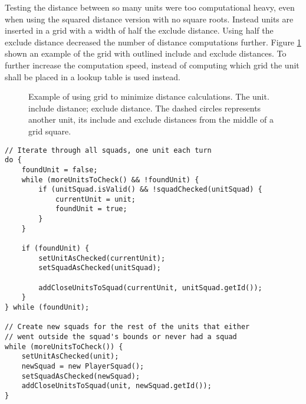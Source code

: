 Testing the distance between so many units were too computational heavy, even when using the squared
distance version with no square roots. Instead units are inserted in a grid with a width of half the
exclude distance. Using half the exclude distance decreased the number of distance computations
further. Figure \ref{fig:player_squad_group_grid} shown an example of the grid with outlined include
and exclude distances. To further increase the computation speed, instead of computing which grid
the unit shall be placed in a lookup table is used instead.

\begin{figure}[htb]
\centering
{}
\caption[Minimizing distance calculation using grids]{
	Example of using grid to minimize distance calculations.
	\usebox{\LegendDotBlue} The unit.
	\usebox{\LegendCircleGreen} include distance;
	\usebox{\LegendCircleRed} exclude distance.
	The dashed circles represents another unit, its include and exclude distances from the middle of a grid square.}
\label{fig:player_squad_group_grid}
\end{figure}

\begin{lstlisting}[label={lst:player_squad_rearrange_squads},caption={Pseudo-code of \texttt{rearrangeSquads()}}]
// Iterate through all squads, one unit each turn
do {
	foundUnit = false;
	while (moreUnitsToCheck() && !foundUnit) {
		if (unitSquad.isValid() && !squadChecked(unitSquad) {
			currentUnit = unit;
			foundUnit = true;
		}
	}
	
	if (foundUnit) {
		setUnitAsChecked(currentUnit);
		setSquadAsChecked(unitSquad);
		
		addCloseUnitsToSquad(currentUnit, unitSquad.getId());
	}
} while (foundUnit);

// Create new squads for the rest of the units that either
// went outside the squad's bounds or never had a squad
while (moreUnitsToCheck()) {
	setUnitAsChecked(unit);
	newSquad = new PlayerSquad();
	setSquadAsChecked(newSquad);
	addCloseUnitsToSquad(unit, newSquad.getId());
}
\end{lstlisting}

